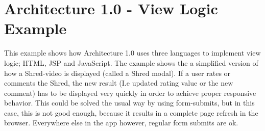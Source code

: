 \section{Architecture 1.0 - View Logic Example}
\label{sec:aview}
This example shows how Architecture 1.0 uses three languages to implement view logic; HTML, JSP and JavaScript. The example shows the a simplified version of how a Shred-video is displayed (called a Shred modal). If a user rates or comments the Shred, the new result (I.e updated rating value or the new comment) has to be displayed very quickly in order to achieve proper responsive behavior. This could be solved the usual way by using form-submits, but in this case, this is not good enough, because it results in a complete page refresh in the browser. Everywhere else in the app however, regular form submits are ok.

